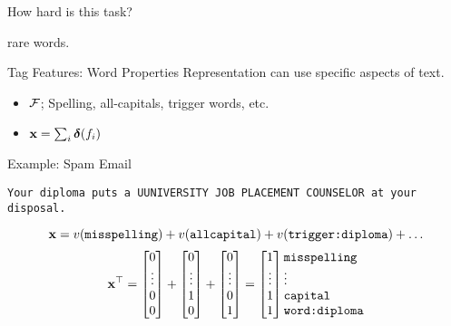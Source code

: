 \documentclass{beamer}
\begin{document}
\begin{frame}{}
  How hard is this task?
  
  rare words. 
\end{frame}

\begin{frame}{Tag Features: Word Properties}
  Representation can use specific aspects of text.
  \begin{itemize}
  \item $\mathcal{F}$; Spelling, all-capitals, trigger words, etc. 
  \item $\mathbf{x} = \sum_{i} \boldsymbol{\delta}(f_i)$ 
  \end{itemize}

  Example: Spam Email

  \begin{center}
    \texttt{Your diploma puts a UUNIVERSITY JOB PLACEMENT COUNSELOR at
      your disposal.}
  \end{center}
  \[  \mathbf{x} = v(\texttt{misspelling}) + v(\texttt{allcapital}) + v(\texttt{trigger:diploma}) + \ldots\]
  \[
  \boldx^\top = 
 \begin{bmatrix} 0 \\ \vdots \\ 0\\  0 \\  \end{bmatrix} + 
 \begin{bmatrix} 0 \\ \vdots \\ 1\\ 0 \\  \end{bmatrix} +
 \begin{bmatrix} 0 \\ \vdots \\ 0\\  1 \\  \end{bmatrix} = 
 \begin{bmatrix} 1 \\ \vdots \\ 1 \\ 1 \\  \end{bmatrix}     \begin{matrix*}[l] \mathrm{\texttt{misspelling}} \\ \vdots \\ \mathrm{\texttt{capital}} \\ \mathrm{\texttt{word:diploma}} \\ \end{matrix*}
  \]
\end{frame}
\end{document}
